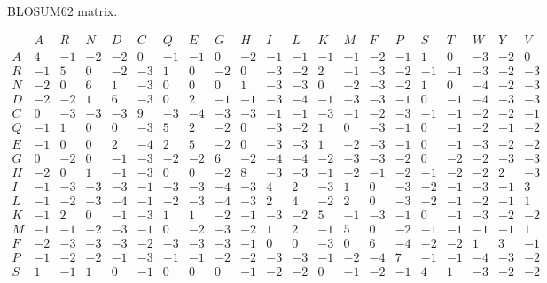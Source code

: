 \begin{table}[tbp]
\caption{BLOSUM62 matrix.}
\label{tab:blosum62}
\footnotesize
\[
\begin{array}{c|rrrrrrrrrrrrrrrrrrrr}
   & A  & R  & N  & D  & C  & Q  & E  & G  & H  & I  & L  & K  & M  & F  & P  & S  & T  & W  & Y  & V \\
\hline
A  &  4 & -1 & -2 & -2 &  0 & -1 & -1 &  0 & -2 & -1 & -1 & -1 & -1 & -2 & -1 &  1 &  0 & -3 & -2 &  0 \\
R  & -1 &  5 &  0 & -2 & -3 &  1 &  0 & -2 &  0 & -3 & -2 &  2 & -1 & -3 & -2 & -1 & -1 & -3 & -2 & -3 \\
N  & -2 &  0 &  6 &  1 & -3 &  0 &  0 &  0 &  1 & -3 & -3 &  0 & -2 & -3 & -2 &  1 &  0 & -4 & -2 & -3 \\
D  & -2 & -2 &  1 &  6 & -3 &  0 &  2 & -1 & -1 & -3 & -4 & -1 & -3 & -3 & -1 &  0 & -1 & -4 & -3 & -3 \\
C  &  0 & -3 & -3 & -3 &  9 & -3 & -4 & -3 & -3 & -1 & -1 & -3 & -1 & -2 & -3 & -1 & -1 & -2 & -2 & -1 \\
Q  & -1 &  1 &  0 &  0 & -3 &  5 &  2 & -2 &  0 & -3 & -2 &  1 &  0 & -3 & -1 &  0 & -1 & -2 & -1 & -2 \\
E  & -1 &  0 &  0 &  2 & -4 &  2 &  5 & -2 &  0 & -3 & -3 &  1 & -2 & -3 & -1 &  0 & -1 & -3 & -2 & -2 \\
G  &  0 & -2 &  0 & -1 & -3 & -2 & -2 &  6 & -2 & -4 & -4 & -2 & -3 & -3 & -2 &  0 & -2 & -2 & -3 & -3 \\
H  & -2 &  0 &  1 & -1 & -3 &  0 &  0 & -2 &  8 & -3 & -3 & -1 & -2 & -1 & -2 & -1 & -2 & -2 &  2 & -3 \\
I  & -1 & -3 & -3 & -3 & -1 & -3 & -3 & -4 & -3 &  4 &  2 & -3 &  1 &  0 & -3 & -2 & -1 & -3 & -1 &  3 \\
L  & -1 & -2 & -3 & -4 & -1 & -2 & -3 & -4 & -3 &  2 &  4 & -2 &  2 &  0 & -3 & -2 & -1 & -2 & -1 &  1 \\
K  & -1 &  2 &  0 & -1 & -3 &  1 &  1 & -2 & -1 & -3 & -2 &  5 & -1 & -3 & -1 &  0 & -1 & -3 & -2 & -2 \\
M  & -1 & -1 & -2 & -3 & -1 &  0 & -2 & -3 & -2 &  1 &  2 & -1 &  5 &  0 & -2 & -1 & -1 & -1 & -1 &  1 \\
F  & -2 & -3 & -3 & -3 & -2 & -3 & -3 & -3 & -1 &  0 &  0 & -3 &  0 &  6 & -4 & -2 & -2 &  1 &  3 & -1 \\
P  & -1 & -2 & -2 & -1 & -3 & -1 & -1 & -2 & -2 & -3 & -3 & -1 & -2 & -4 &  7 & -1 & -1 & -4 & -3 & -2 \\
S  &  1 & -1 &  1 &  0 & -1 &  0 &  0 &  0 & -1 & -2 & -2 &  0 & -1 & -2 & -1 &  4 &  1 & -3 & -2 & -2 \\

\end{array}\]
\end{table}
